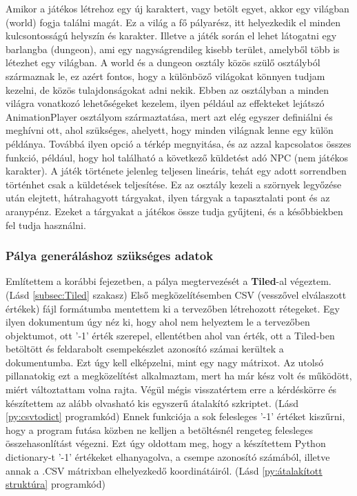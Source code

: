  Amikor a játékos létrehoz egy új karaktert, vagy betölt egyet, akkor egy világban (world) fogja találni magát. Ez a világ a fő pályarész, itt helyezkedik el minden kulcsontosságú helyszín és karakter. Illetve a játék során el lehet látogatni egy barlangba (dungeon), ami egy nagyságrendileg kisebb terület, amelyből több is létezhet egy világban.
 A world és a dungeon osztály közös szülő osztályból származnak le, ez azért fontos, hogy a különböző világokat könnyen tudjam kezelni, de közös tulajdonságokat adni nekik. Ebben az osztályban a minden világra vonatkozó lehetőségeket kezelem, ilyen például
  az effekteket lejátszó AnimationPlayer osztályom származtatása, mert azt elég egyszer definiálni és meghívni ott, ahol szükséges, ahelyett,
   hogy minden világnak lenne egy külön példánya. Továbbá ilyen opció a térkép megnyitása, és az azzal kapcsolatos összes funkció,
    például, hogy hol található a következő küldetést adó NPC (nem játékos karakter). A játék története jelenleg teljesen lineáris,
     tehát egy adott sorrendben történhet csak a küldetések teljesítése. Ez az osztály kezeli a szörnyek legyőzése után elejtett, hátrahagyott tárgyakat, ilyen tárgyak a tapasztalati pont és az aranypénz.
       Ezeket a tárgyakat a játékos össze tudja gyűjteni, és a későbbiekben fel tudja használni.  

\subsubsection{Pálya generáláshoz szükséges adatok} \label {subsec:Pálya generáláshoz szükséges adatok}

 Említettem a korábbi fejezetben, a pálya megtervezését a \textbf{Tiled}-al végeztem. (Lásd \ref{subsec:Tiled} szakasz) 
Első megközelítésemben CSV (vesszővel elválaszott értékek) fájl formátumba mentettem ki a tervezőben létrehozott rétegeket. Egy ilyen dokumentum úgy néz ki, hogy ahol nem helyeztem le a tervezőben objektumot, ott '-1' érték szerepel, ellentétben ahol van érték, ott a Tiled-ben betöltött és feldarabolt csempekészlet azonosító számai kerültek a dokumentumba. Ezt úgy kell elképzelni, mint egy nagy mátrixot. Az utolsó pillanatokig ezt a megközelítést alkalmaztam, mert ha már kész volt és működött, miért változtattam volna rajta. Végül mégis visszatértem erre a kérdéskörre és készítettem az alább olvasható kis egyszerű átalakító szkriptet. (Lásd \ref{py:csvtodict} programkód) Ennek funkciója a sok felesleges '-1' értéket kiszűrni, hogy a program futása közben ne kelljen a betöltésnél rengeteg felesleges összehasonlítást végezni. Ezt úgy oldottam meg, hogy a készítettem Python dictionary-t '-1' értékeket elhanyagolva, a csempe azonosító számából, illetve annak a .CSV mátrixban elhelyezkedő koordinátáiról. (Lásd \ref{py:átalakított struktúra} programkód)


